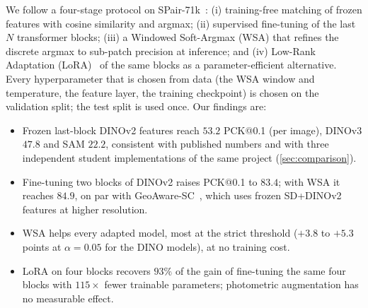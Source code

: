 We follow a four-stage protocol on SPair-71k~\cite{min2019spair}: (i) training-free matching of frozen features with cosine similarity and argmax; (ii) supervised fine-tuning of the last $N$ transformer blocks; (iii) a Windowed Soft-Argmax (WSA) that refines the discrete argmax to sub-patch precision at inference; and (iv) Low-Rank Adaptation (LoRA)~\cite{hu2022lora} of the same blocks as a parameter-efficient alternative. Every hyperparameter that is chosen from data (the WSA window and temperature, the feature layer, the training checkpoint) is chosen on the validation split; the test split is used once. Our findings are:
\begin{itemize}
    \item Frozen last-block DINOv2 features reach $53.2$ PCK@0.1 (per image), DINOv3 $47.8$ and SAM $22.2$, consistent with published numbers and with three independent student implementations of the same project (\cref{sec:comparison}).
    \item Fine-tuning two blocks of DINOv2 raises PCK@0.1 to $83.4$; with WSA it reaches $84.9$, on par with GeoAware-SC~\cite{zhang2024telling}, which uses frozen SD+DINOv2 features at higher resolution.
    \item WSA helps every adapted model, most at the strict threshold ($+3.8$ to $+5.3$ points at $\alpha{=}0.05$ for the DINO models), at no training cost.
    \item LoRA on four blocks recovers $93\%$ of the gain of fine-tuning the same four blocks with $115\times$ fewer trainable parameters; photometric augmentation has no measurable effect.
\end{itemize}
